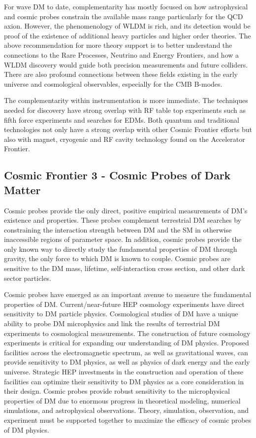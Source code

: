 \documentclass[nofootinbib]{article}
\begin{document}
For wave DM to date, complementarity has mostly focused on how astrophysical and cosmic probes constrain the available mass range particularly for the QCD axion. However, the phenomenology of WLDM is rich, and its detection would be proof of the existence of additional heavy particles and higher order theories. The above recommendation for more theory support is to better understand the connections to the Rare Processes, Neutrino and Energy Frontiers, and how a WLDM discovery would guide both precision measurements and future colliders. There are also profound connections between these fields existing in the early universe and cosmological observables, especially for the CMB B-modes.

The complementarity within instrumentation is more immediate. The techniques needed for discovery have strong overlap with RF table top experiments such as fifth force experiments and searches for EDMs. Both quantum and traditional technologies not only have a strong overlap with other Cosmic Frontier efforts but also with magnet, cryogenic and RF cavity technology found on the Accelerator Frontier.  

\subsection{Cosmic Frontier 3 - Cosmic Probes of Dark Matter}

Cosmic probes provide the only direct, positive empirical measurements of DM's existence and properties.
These probes complement terrestrial DM searches by constraining the interaction strength between DM and the SM in otherwise inaccessible regions of parameter space.
In addition, cosmic probes provide the only known way to directly study the fundamental properties of DM through gravity, the only force to which DM is known to couple.
Cosmic probes are sensitive to the DM mass, lifetime, self-interaction cross section, and other dark sector particles.



Cosmic probes have emerged as an important avenue to measure the fundamental properties of DM. 
Current/near-future HEP cosmology experiments have direct sensitivity to DM particle physics. 
Cosmological studies of DM have a unique ability to probe DM microphysics and link the results of terrestrial DM experiments to cosmological measurements.
The construction of future cosmology experiments is critical for expanding our understanding of DM physics. Proposed facilities across the electromagnetic spectrum, as well as gravitational waves, can provide sensitivity to DM physics, as well as physics of dark energy and the early universe. 
Strategic HEP investments in the construction and operation of these facilities can optimize their sensitivity to DM physics as a core consideration in their design.
Cosmic probes provide robust sensitivity to the microphysical properties of DM due to enormous progress in theoretical modeling, numerical simulations, and astrophysical observations. 
Theory, simulation, observation, and experiment must be supported together to maximize the efficacy of cosmic probes of DM physics.
\end{document}
